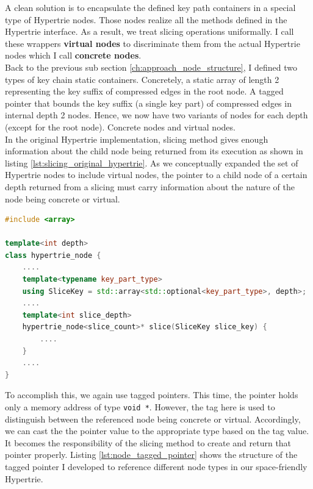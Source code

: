 A clean solution is to encapsulate the defined key path containers in a special type of Hypertrie nodes. 
Those nodes realize all the methods defined in the Hypertrie interface. 
As a result, we treat slicing operations uniformally. 
I call these wrappers \textbf{virtual nodes} to discriminate them from the actual Hypertrie nodes which I call \textbf{concrete nodes}. \\

Back to the previous sub section \ref{ch:approach_node_structure}, I defined two types of key chain static containers. 
Concretely, a static array of length 2 representing the key suffix of compressed edges in the root node. 
A tagged pointer that bounds the key suffix (a single key part) of compressed edges in internal depth 2 nodes. 
Hence, we now have two variants of nodes for each depth (except for the root node). Concrete nodes and virtual nodes. \\

In the original Hypertrie implementation, slicing method gives enough information about the child node being returned from its execution as shown in listing \ref{lst:slicing_original_hypertrie}. 
As we conceptually expanded the set of Hypertrie nodes to include virtual nodes, the pointer to a child node of a certain depth returned from a slicing must carry information about the nature of the node being concrete or virtual.

\begin{lstlisting}[caption={Slicing method signituar defined for node where d = $depth$ in original Hypertrie},label={lst:slicing_original_hypertrie},language=C++]
#include <array>

template<int depth>
class hypertrie_node {
	....
	template<typename key_part_type>
	using SliceKey = std::array<std::optional<key_part_type>, depth>;
	....
	template<int slice_depth>
	hypertrie_node<slice_count>* slice(SliceKey slice_key) {
		....
	}
	....
}
\end{lstlisting} 

To accomplish this, we again use tagged pointers. This time, the pointer holds only a memory address of type \texttt{void *}. However, the tag here is used to distinguish between the referenced node being concrete or virtual. Accordingly, we can cast the the pointer value to the appropriate type based on the tag value. 
It becomes the responsibility of the slicing method to create and return that pointer properly. Listing \ref{lst:node_tagged_pointer} shows the structure of the tagged pointer I developed to reference different node types in our space-friendly Hypertrie. 

